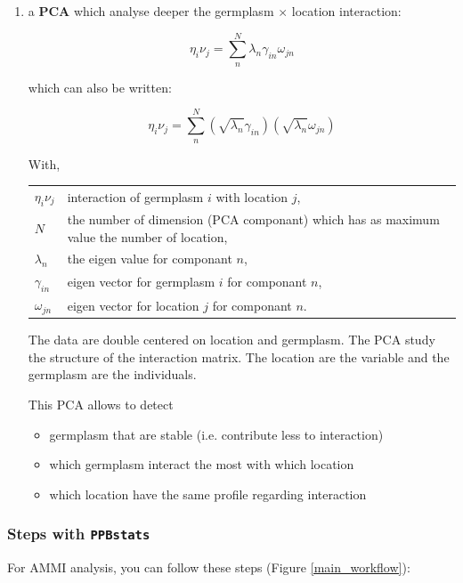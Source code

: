 \documentclass{article}\usepackage[]{graphicx}\usepackage[]{color}
\newcommand{\pack}{\texttt{PPBstats}}
\begin{document}
\begin{enumerate}
\item a \textbf{PCA} which analyse deeper the germplasm $\times$ location interaction: 

\begin{displaymath}
\eta_{i}\nu_{j} = \sum_{n}^{N} \lambda_{n} \gamma_{in} \omega_{jn}
\end{displaymath}

which can also be written:

\begin{displaymath}
\eta_{i}\nu_{j} = \sum_{n}^{N} (\sqrt{\lambda_{n}} \gamma_{in}) (\sqrt{\lambda_{n}} \omega_{jn})
\end{displaymath}


With,

\begin{tabular}{ll}
$\eta_{i}\nu_{j}$ & interaction of germplasm $i$ with location $j$, \\
$N$ & the number of dimension (PCA componant) which has as maximum value the number of location, \\
$\lambda_{n}$ & the eigen value for componant $n$, \\
$\gamma_{in}$ & eigen vector for germplasm $i$ for componant $n$, \\
$\omega_{jn}$ & eigen vector for  location $j$  for componant $n$. \\
\end{tabular}


The data are double centered on location and germplasm.
The PCA study the structure of the interaction matrix.
The location are the variable and the germplasm are the individuals.

This PCA allows to detect
\begin{itemize}
\item germplasm that are stable (i.e. contribute less to interaction)
\item which germplasm interact the most with which location
\item which location have the same profile regarding interaction
\end{itemize}

\end{enumerate}


\subsubsection{Steps with \pack}

For AMMI analysis, you can follow these steps (Figure \ref{main_workflow}):
\end{document}
